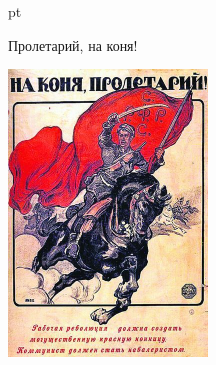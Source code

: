\documentclass[pdftex,12pt,a4paper]{article}
\begin{document}
 pt %

{\Large Пролетарий, на коня! }
\begin{center}
\includegraphics[height=3in]{proletarii.jpg}
\end{center}
\end{document}
